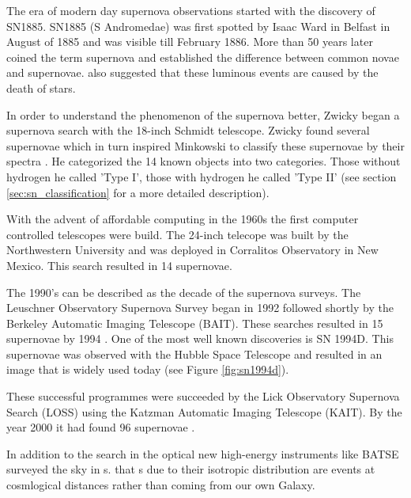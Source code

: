 The era of modern day supernova observations started with the discovery of SN1885. SN1885 (S Andromedae) was first spotted by Isaac Ward in Belfast in August of 1885 \citep{1885AN....112..360H} and was visible till February 1886. 
More than 50 years later \citet{1934PNAS...20..254B} coined the term supernova and established the difference between common novae and supernovae. \citet{1934PNAS...20..254B} also suggested that these luminous events are caused by the death of stars. 

In order to understand the phenomenon of the supernova better, Zwicky began a supernova search with the 18-inch Schmidt telescope. Zwicky found several supernovae which in turn inspired Minkowski to classify these supernovae by their spectra \citet{1941PASP...53..224M}. 
He categorized the 14 known objects into two categories. Those without hydrogen he called 'Type I', those with hydrogen he called 'Type II' (see section \ref{sec:sn_classification} for a more detailed description).

With the advent of affordable computing in the 1960s the first computer controlled telescopes were build. The 24-inch telecope was built by the Northwestern University and was deployed in Corralitos Observatory in New Mexico. This search resulted in 14 supernovae. 

The 1990's can be described as the decade of the supernova surveys. The Leuschner Observatory Supernova Survey began in 1992 followed shortly by the Berkeley Automatic Imaging Telescope (BAIT). These searches resulted in 15 supernovae by 1994 \citep{1994AAS...185.7905V}. One of the most well known discoveries is SN 1994D. This supernovae was observed with the Hubble Space Telescope and resulted in an image that is widely used today (see Figure \ref{fig:sn1994d}).


These successful programmes were succeeded by the Lick Observatory Supernova Search (LOSS) using the Katzman Automatic Imaging Telescope (KAIT). By the year 2000 it had found 96 supernovae \citep{2001ASPC..246..121F}. 

In addition to the search in the optical new high-energy instruments like BATSE surveyed the sky in \gammaray s. \citet{1992Natur.355..143M} that \grb s due to their isotropic distribution are events at cosmlogical distances rather than coming from our own Galaxy. 

